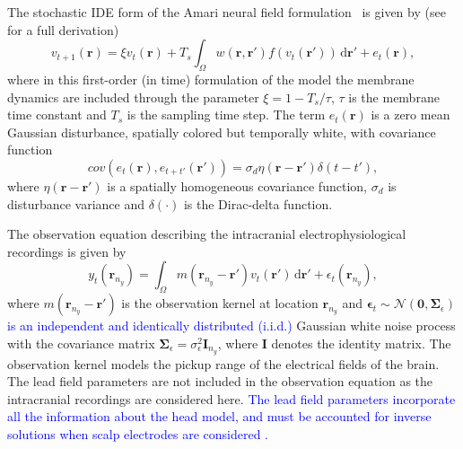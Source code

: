 \documentclass[review,authoryear,3p]{elsarticle}
\newcommand{\parham}[1]{\textcolor{blue}{#1}}
\begin{document}
The stochastic IDE form of the Amari neural field formulation~\cite{Amari1977} is given by (see~\cite{Freestone2011} for a full derivation)
\begin{equation}\label{eq:DiscreteTimeModel}
	v_{t+1}\left(\mathbf{r}\right) = 
	\xi v_t\left(\mathbf{r}\right) + 
	T_s \int_\Omega { 
	    w\left(\mathbf{r},\mathbf{r'}\right)
	    f\left(v_t\left(\mathbf{r}'\right)\right) 
	\, \mathrm{d}\mathbf{r}'} 
	+ e_t\left(\mathbf{r}\right), 
\end{equation}
where in this first-order (in time) formulation of the model the membrane dynamics are included through the parameter $\xi=1-T_s/\tau$, $\tau$ is the membrane time constant and $T_s$ is the sampling time step. The term $e_t(\mathbf r)$ is a zero mean Gaussian disturbance, spatially colored but temporally white, with covariance function 
\begin{equation}
cov\left(e_{t}\left(\mathbf{r}\right),e_{t+t'}\left(\mathbf{r'}\right)\right)=\sigma_d\eta(\mathbf{r}-\mathbf{r'})\delta(t-t'),
\label{eq:FieldDisturbance}
\end{equation}
where $\eta(\mathbf{r}-\mathbf{r'})$ is a spatially homogeneous covariance function, $\sigma_d$ is disturbance variance and $\delta(\cdot)$ is the Dirac-delta function. %

The observation equation describing the intracranial electrophysiological recordings is given by
\begin{equation}\label{eq:ObservationEquation}
	y_t(\mathbf{r}_{n_y}) = \int_{\Omega} { m\left(\mathbf{r}_{n_y}-\mathbf{r}'\right) v_t\left(\mathbf{r}'\right) \, \mathrm{d}\mathbf{r}'} + \epsilon_t(\mathbf{r}_{n_y}), 
\end{equation}
where $m\left(\mathbf{r}_{n_y}-\mathbf{r}'\right)$ is the observation kernel at location $\mathbf{r}_{n_y}$ and  $\boldsymbol{\epsilon}_{t}\sim \mathcal{N}\left(\mathbf{0},\mathbf{\Sigma}_{\epsilon}\right)$ \parham{is an independent and identically distributed (i.i.d.)} Gaussian white noise process with the covariance matrix $\mathbf{\Sigma}_{\epsilon}=\sigma^2_{\epsilon}\mathbf I_{n_y}$, where $\mathbf I$ denotes the identity matrix. The observation kernel models the pickup range of the electrical fields of the brain. The lead field parameters are not included in the observation equation as the intracranial recordings are considered here. \parham{The lead field parameters incorporate all the information about the head model, and must be accounted for inverse solutions when scalp electrodes are considered \cite{Jirsa2007}.} 
\end{document}
